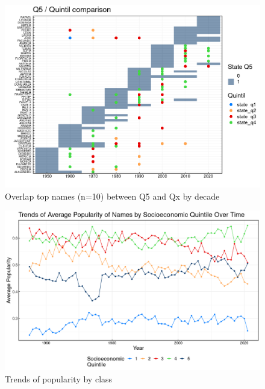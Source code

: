 \begin{figure}[H]
\begin{center}
    \includegraphics[width=12cm]{plot/Q5_all_comparison.png}
    \caption{Overlap top names (n=10) between Q5 and Qx by decade}
    \label{fig:new_names}
\end{center}
\end{figure}



\begin{figure}[H]
\begin{center}
    \includegraphics[width=15cm]{plot/p3.png}
    \caption{Trends of popularity by class}
    \label{fig:new_names}
\end{center}
\end{figure}

